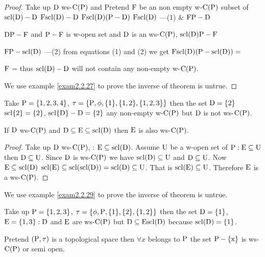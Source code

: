\begin{proof}
Take up $\mathrm{D}$ ws-$\mathrm{C}(\mathrm{P})$ and Pretend $\mathrm{F}$ be an non empty w-$\mathrm{C}(\mathrm{P})$ subset of $\mathrm{scl}(\mathrm{D})-\mathrm{D}$ $\mathrm{F}\mathrm{scl}(\mathrm{D})-\mathrm{D}$ $\mathrm{F}\mathrm{scl}(\mathrm{D})(\mathrm{P}-\mathrm{D})$ $\mathrm{F}\mathrm{scl}(\mathrm{D})$ ---(1) \& $\mathrm{F}\mathrm{P}-\mathrm{D}$

$\mathrm{D}\mathrm{P}-\mathrm{F}$ and $\mathrm{P}-\mathrm{F}$ is w-open set and $\mathrm{D}$ is an ws-$\mathrm{C}(\mathrm{P})$, $\mathrm{scl}(\mathrm{D})\mathrm{P}-\mathrm{F}$

$\mathrm{F}\mathrm{P}-\mathrm{scl}(\mathrm{D})$ ---(2) from equations (1) and (2) we get $\mathrm{F}\mathrm{scl}(\mathrm{D})(\mathrm{P}-\mathrm{scl}(\mathrm{D}))=$

$\mathrm{F}$ = thus $\mathrm{scl}(\mathrm{D})-\mathrm{D}$ will not contain any non-empty w-$\mathrm{C}(\mathrm{P})$.

We use example \ref{exam2.2.27} to prove the inverse of theorem is untrue.
\end{proof}

\begin{exm}\label{exam2.2.27}
Take $\mathrm{P}=\{1,2,3,4\}$, $\tau=\{\mathrm{P},\phi,\{1\},\{1, 2\},\{1,2,3\}\}$ then the set $\mathrm{D}=\{2\}$ $\mathrm{scl}\{2\}=\{2\}$, $\mathrm{scl}\{\mathrm{D}\}-\mathrm{D}=\{2\}$ any non-empty w-$\mathrm{C}(\mathrm{P})$ but $\mathrm{D}$ is not ws-$\mathrm{C}(\mathrm{P})$.
\end{exm}

\begin{thm}\label{thm2.2.28}
If $\mathrm{D}$ ws-$\mathrm{C}(\mathrm{P})$ and $\mathrm{D}\subseteq \mathrm{E}\subseteq \mathrm{scl}(\mathrm{D})$ then $\mathrm{E}$ is also ws-$\mathrm{C}(\mathrm{P})$.
\end{thm}

\begin{proof}
Take up $\mathrm{D}$ ws-$\mathrm{C}(\mathrm{P})$, : $\mathrm{E}\subseteq \mathrm{scl}(\mathrm{D})$. Assume $\mathrm{U}$ be a w-open set of $\mathrm{P} : \mathrm{E}\subseteq \mathrm{U}$ then $\mathrm{D}\subseteq \mathrm{U}$. Since $\mathrm{D}$ is ws-$\mathrm{C}(\mathrm{P})$ we have $\mathrm{scl}(\mathrm{D})\subseteq \mathrm{U}$ and $\mathrm{D}\subseteq \mathrm{U}$. Now $\mathrm{E}\subseteq \mathrm{scl}(\mathrm{D})$ $\mathrm{scl}(\mathrm{E})\subseteq \mathrm{scl}(\mathrm{scl}(\mathrm{D}))=\mathrm{scl}(\mathrm{D})\subseteq \mathrm{U}$. That is $\mathrm{scl}(\mathrm{E})\subseteq \mathrm{U}$. Therefore $\mathrm{E}$ is a ws-$\mathrm{C}(\mathrm{P})$.
\end{proof}

We use example \ref{exam2.2.29} to prove the inverse of theorem is untrue.

\begin{exm}\label{exam2.2.29}
Take up $\mathrm{P} = \{1,2,3 \}$, $\tau = \{\phi, \mathrm{P}, \{1\}, \{2\}, \{1, 2\}\}$ then the set $\mathrm{D}=\{1\}$, $\mathrm{E}=\{1,3\}:\mathrm{D}$ and $\mathrm{E}$ are ws-$\mathrm{C}(\mathrm{P})$ but $\mathrm{D}\subseteq \mathrm{E} \mathrm{scl}(\mathrm{D})$ because $\mathrm{scl}(\mathrm{D})=\{1\}$.
\end{exm}

\begin{thm}\label{thm2.2.30}
Pretend $(\mathrm{P},\tau)$ is a topological space then $\forall x$ belongs to $\mathrm{P}$ the set $\mathrm{P}-\{\mathrm{x}\}$ is ws-$\mathrm{C}(\mathrm{P})$ or semi open.
\end{thm}

